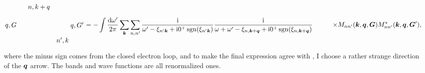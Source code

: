 \documentclass[hyperref, a4paper]{report}
\DeclareMathOperator{\sgn}{sgn}
\newcommand*{\ii}{\mathrm{i}}
\def\\{}%
\begin{document}
\begin{equation}
\begin{aligned}
\begin{gathered}
\begin{tikzpicture}[x=0.75pt,y=0.75pt,yscale=-1,xscale=1]
                \draw (35.5,59) node [anchor=east] [inner sep=0.75pt]    {$q,G$};
                \draw (141.52,59) node [anchor=west] [inner sep=0.75pt]    {$q,G'$};
                \draw (113,82) node [anchor=north west][inner sep=0.75pt]    {$n',k$};
                \draw (56,15) node [anchor=north west][inner sep=0.75pt]    {$n,k+q$};
                
                
                \end{tikzpicture}            
        \end{gathered} \\
        &= - \int \frac{\dd{\omega'}}{2\pi} \sum_{\vb*{k}} \sum_{n, n'}
        \frac{\ii}{\omega' - \xi_{n' \vb*{k}} + \ii 0^+ \sgn(\xi_{n' \vb*{k}})} 
        \frac{\ii}{\omega + \omega' - \xi_{n, \vb*{k} + \vb*{q}} + \ii 0^+ \sgn(\xi_{n, \vb*{k} + \vb*{q}})} \\
        &\quad \quad \times M_{n n' } (\vb*{k}, \vb*{q}, \vb*{G}) M_{nn'}^* (\vb*{k}, \vb*{q}, \vb*{G}') ,
    \end{aligned}
\end{equation}
where the minus sign comes from the closed electron loop,
and to make the final expression agree with \cite{berkeleygw},
I choose a rather strange direction of the $\vb*{q}$ arrow.
The bands and wave functions are all renormalized ones.
\end{document}

